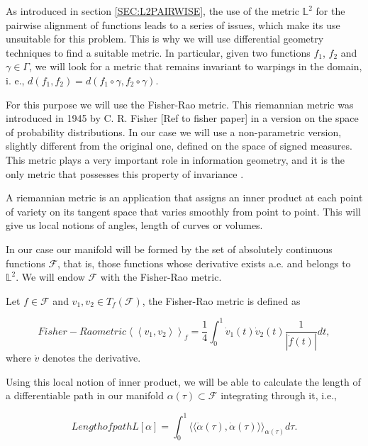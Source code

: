 As introduced in section \ref{SEC:L2PAIRWISE}, the use of the metric $\mathbb{L}^2$
for the pairwise alignment of functions leads to a series of issues, which make
its use unsuitable for this problem. This is why we will use differential
geometry techniques to find a suitable metric. In particular, given two
functions $f_1$, $f_2$ and $\gamma \in \Gamma$, we will look for a metric that
remains invariant to warpings in the domain, i. e.,
$d(f_1, f_2) = d(f_1 \circ \gamma, f_2 \circ \gamma)$.

For this purpose we will use the Fisher-Rao metric. This riemannian metric was
introduced in 1945 by C. R. Fisher [Ref to fisher paper] in a version on the
space of probability distributions. In our case we will use a non-parametric
version, slightly different from the original one, defined on the space of
signed measures. This metric plays a very important role in information
geometry, and it is the only metric that possesses this property of
invariance \cite{Cencov1982}.

A riemannian metric is an application that assigns an inner product at each
point of variety on its tangent space that varies smoothly from point to point.
This will give us local notions of angles, length of curves or volumes.

In our case our manifold will be formed by the set of absolutely continuous
functions $\mathcal{F}$, that is, those functions whose derivative exists a.e.
and belongs to $\mathbb{L}^2$. We will endow $\mathcal{F}$ with the
Fisher-Rao metric.

Let $f \in \mathcal{F}$  and $v_{1}, v_{2} \in T_{f}(\mathcal{F})$,
the Fisher-Rao metric is defined as

\begin{equation}[EQ:FRAO]{Fisher-Rao metric}
\left\langle\left\langle v_{1}, v_{2}\right\rangle\right\rangle_{f}=
\frac{1}{4} \int_{0}^{1} \dot{v}_{1}(t) \dot{v}_{2}(t) \frac{1}{|\dot{f}(t)|}dt,
\end{equation}
where $\dot v$ denotes the derivative.

Using this local notion of inner product, we will be able to calculate the
length of a differentiable path in our manifold
$\alpha(\tau) \subset \mathcal{F}$ integrating through it, i.e.,

\begin{equation}[]{Length of path}
L[\alpha] = \int_0^1 \langle \langle \dot \alpha(\tau), \dot \alpha(\tau)
\rangle \rangle_{\alpha(\tau)} d\tau.
\end{equation}

